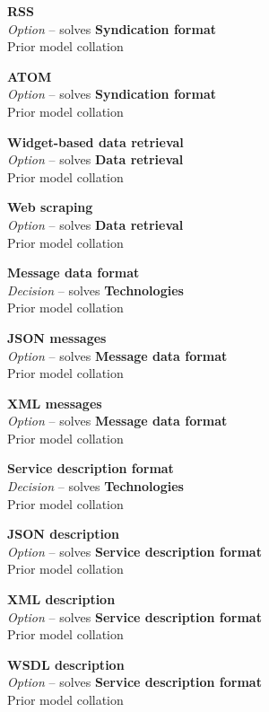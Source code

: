 \textbf{RSS} \\ \emph{Option} -- solves \textbf{Syndication format} \\ Prior model collation \cite{Minhas2012}

\textbf{ATOM} \\ \emph{Option} -- solves \textbf{Syndication format} \\ Prior model collation \cite{Minhas2012}

\textbf{Widget-based data retrieval} \\ \emph{Option} -- solves \textbf{Data retrieval} \\ Prior model collation \cite{Minhas2012}

\textbf{Web scraping} \\ \emph{Option} -- solves \textbf{Data retrieval} \\ Prior model collation \cite{Minhas2012}

\textbf{Message data format} \\ \emph{Decision} -- solves \textbf{Technologies} \\ Prior model collation \cite{Pietschmann2010}

\textbf{JSON messages} \\ \emph{Option} -- solves \textbf{Message data format} \\ Prior model collation \cite{Pietschmann2010}

\textbf{XML messages} \\ \emph{Option} -- solves \textbf{Message data format} \\ Prior model collation \cite{Pietschmann2010}

\textbf{Service description format} \\ \emph{Decision} -- solves \textbf{Technologies} \\ Prior model collation \cite{Pietschmann2010}

\textbf{JSON description} \\ \emph{Option} -- solves \textbf{Service description format} \\ Prior model collation \cite{Pietschmann2010}

\textbf{XML description} \\ \emph{Option} -- solves \textbf{Service description format} \\ Prior model collation \cite{Pietschmann2010}

\textbf{WSDL description} \\ \emph{Option} -- solves \textbf{Service description format} \\ Prior model collation \cite{Pietschmann2010}

